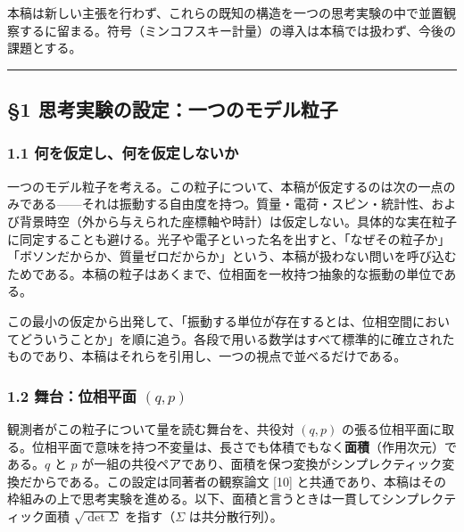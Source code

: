 \documentclass[
]{ltjsarticle}
\begin{document}
本稿は新しい主張を行わず、これらの既知の構造を一つの思考実験の中で並置観察するに留まる。符号（ミンコフスキー計量）の導入は本稿では扱わず、今後の課題とする。

\begin{center}\rule{0.5\linewidth}{0.5pt}\end{center}

\subsection{§1
思考実験の設定：一つのモデル粒子}\label{ux601dux8003ux5b9fux9a13ux306eux8a2dux5b9aux4e00ux3064ux306eux30e2ux30c7ux30ebux7c92ux5b50}

\subsubsection{1.1
何を仮定し、何を仮定しないか}\label{ux4f55ux3092ux4eeeux5b9aux3057ux4f55ux3092ux4eeeux5b9aux3057ux306aux3044ux304b}

一つのモデル粒子を考える。この粒子について、本稿が仮定するのは次の一点のみである------それは振動する自由度を持つ。質量・電荷・スピン・統計性、および背景時空（外から与えられた座標軸や時計）は仮定しない。具体的な実在粒子に同定することも避ける。光子や電子といった名を出すと、「なぜその粒子か」「ボソンだからか、質量ゼロだからか」という、本稿が扱わない問いを呼び込むためである。本稿の粒子はあくまで、位相面を一枚持つ抽象的な振動の単位である。

この最小の仮定から出発して、「振動する単位が存在するとは、位相空間においてどういうことか」を順に追う。各段で用いる数学はすべて標準的に確立されたものであり、本稿はそれらを引用し、一つの視点で並べるだけである。

\subsubsection{\texorpdfstring{1.2 舞台：位相平面
\((q,p)\)}{1.2 舞台：位相平面 (q,p)}}\label{ux821eux53f0ux4f4dux76f8ux5e73ux9762-qp}

観測者がこの粒子について量を読む舞台を、共役対 \((q,p)\)
の張る位相平面に取る。位相平面で意味を持つ不変量は、長さでも体積でもなく\textbf{面積}（作用次元）である。\(q\)
と \(p\)
が一組の共役ペアであり、面積を保つ変換がシンプレクティック変換だからである。この設定は同著者の観察論文
{[}10{]}
と共通であり、本稿はその枠組みの上で思考実験を進める。以下、面積と言うときは一貫してシンプレクティック面積
\(\sqrt{\det\Sigma}\) を指す（\(\Sigma\) は共分散行列）。
\end{document}
